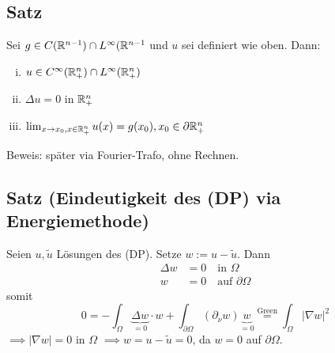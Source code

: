 \subsection{Satz}

Sei $g \in C(\mathbb{R}^{n  - 1}) \cap L^\infty(\mathbb{R}^{n - 1}$ und $u$ sei definiert wie oben. Dann:
\begin{enumerate}[i)]
	\item $u \in C^\infty(\mathbb{R}^n_+) \cap L^\infty(\mathbb{R}^n_+)$
	\item $\Delta u = 0$ in $\mathbb{R}^n_+$
	\item $\lim_{x \to x_0, x \in \mathbb{R}^n_+} u(x) = g(x_0), x_0 \in \partial \mathbb{R}^n_+$
\end{enumerate}

Beweis: später via Fourier-Trafo, ohne Rechnen.

\subsection{Satz (Eindeutigkeit des (DP) via Energiemethode)}

Seien $u, \tilde u$ Lösungen des (DP). Setze $w:= u - \tilde u$. Dann
\begin{align*}
	\Delta w &= 0 \quad\text{in } \Omega \\
	w &= 0 \quad\text{auf } \partial \Omega
\end{align*}
somit
$$
0 = -\int_\Omega \underbrace{\Delta w}_{= 0 } \cdot w + \int_{\partial \Omega} (\partial_\nu w) \underbrace{w}_{=0} \overset{\text{Green}}{=} \int_\Omega |\nabla w|^2
$$
$\implies |\nabla w| = 0$ in $\Omega$ $\implies w = u - \tilde u = 0$, da $w = 0$ auf $\partial \Omega$.
